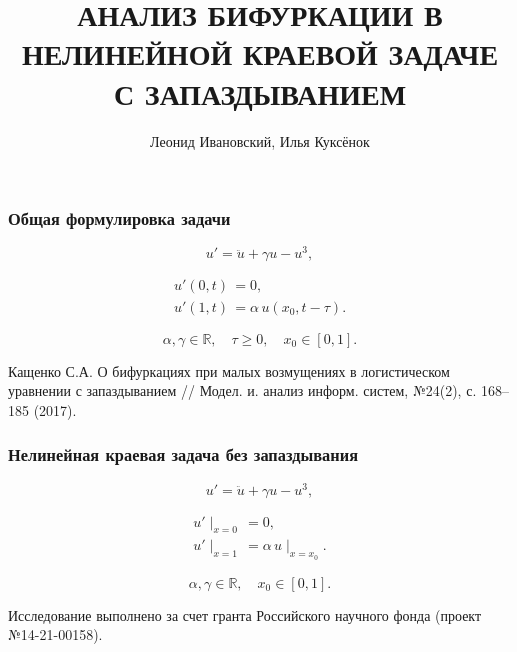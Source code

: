 \documentclass[fullscreen=true, unicode, bookmarks=false]{beamer}
\title[]{ АНАЛИЗ БИФУРКАЦИИ В НЕЛИНЕЙНОЙ КРАЕВОЙ ЗАДАЧЕ С ЗАПАЗДЫВАНИЕМ }
\author[]{{\large Леонид Ивановский, Илья Куксёнок}}
\date{}
\institute[]
{  }
\begin{document}
\begin{frame}
\titlepage
\end{frame} 

\begin{frame}
\frametitle{ Общая формулировка задачи }
 
\begin{equation}\label{eq1}
	u' = \ddot{u} + \gamma u - u^3,
\end{equation}	

\begin{gather}\label{eq2}	
	u'(0, t) \, = 0, \\
	u'(1, t) \, = \alpha\,u(x_0, t-\tau). \nonumber
\end{gather}

$$ \alpha, \gamma \in \mathbb{R}, \quad \tau \geqslant 0, \quad x_0 \in [0, 1]. $$

\medskip
\pause

\begin{exampleblock}{}
{\large Кащенко С.А. О бифуркациях при малых возмущениях в логистическом уравнении с запаздыванием // Модел. и. анализ информ. систем, №24(2), с. 168--185 (2017). }
\end{exampleblock}

\end{frame}

\begin{frame}
\frametitle{ Нелинейная краевая задача без запаздывания}
 
\begin{equation}\label{eq3}
	u' = \ddot{u} + \gamma u - u^3,
\end{equation}	

\begin{gather}\label{eq4}	
	u'\mid_{x=0} \, = 0, \\
	u'\mid_{x=1} \, = \alpha\,u\mid_{x=x_0}. \nonumber
\end{gather}

$$ \alpha, \gamma \in \mathbb{R}, \quad x_0 \in [0, 1]. $$

\medskip

\begin{exampleblock}{}
{\large Исследование выполнено за счет гранта Российского научного фонда (проект №14-21-00158). }
\end{exampleblock}

\end{frame}
\end{document}
